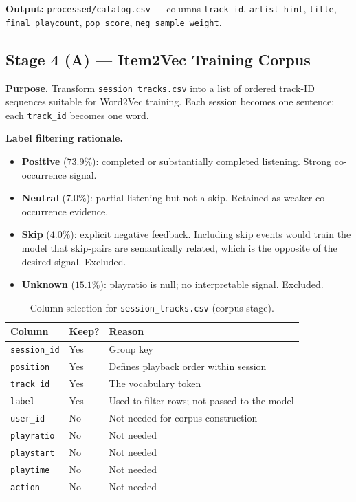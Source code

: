 \documentclass[11pt]{article}
\begin{document}
\textbf{Output:} \texttt{processed/catalog.csv} ---
columns \texttt{track\_id}, \texttt{artist\_hint}, \texttt{title},
\texttt{final\_playcount}, \texttt{pop\_score}, \texttt{neg\_sample\_weight}.

\subsection{Stage 4 (A) --- Item2Vec Training Corpus}

\textbf{Purpose.}
Transform \texttt{session\_tracks.csv} into a list of ordered track-ID sequences
suitable for Word2Vec training. Each session becomes one sentence;
each \texttt{track\_id} becomes one word.

\textbf{Label filtering rationale.}
\begin{itemize}
  \item \textbf{Positive} ($73.9\%$): completed or substantially completed
        listening. Strong co-occurrence signal.
  \item \textbf{Neutral} ($7.0\%$): partial listening but not a skip.
        Retained as weaker co-occurrence evidence.
  \item \textbf{Skip} ($4.0\%$): explicit negative feedback. Including skip
        events would train the model that skip-pairs are semantically related,
        which is the opposite of the desired signal. Excluded.
  \item \textbf{Unknown} ($15.1\%$): playratio is null; no interpretable
        signal. Excluded.
\end{itemize}

\begin{table}[H]
\centering
\caption{Column selection for \texttt{session\_tracks.csv} (corpus stage).}
\begin{tabular}{lll}
\toprule
\textbf{Column} & \textbf{Keep?} & \textbf{Reason} \\
\midrule
\texttt{session\_id} & Yes & Group key \\
\texttt{position}    & Yes & Defines playback order within session \\
\texttt{track\_id}   & Yes & The vocabulary token \\
\texttt{label}       & Yes & Used to filter rows; not passed to the model \\
\texttt{user\_id}    & No  & Not needed for corpus construction \\
\texttt{playratio}   & No  & Not needed \\
\texttt{playstart}   & No  & Not needed \\
\texttt{playtime}    & No  & Not needed \\
\texttt{action}      & No  & Not needed \\
\bottomrule
\end{tabular}
\end{table}
\end{document}
